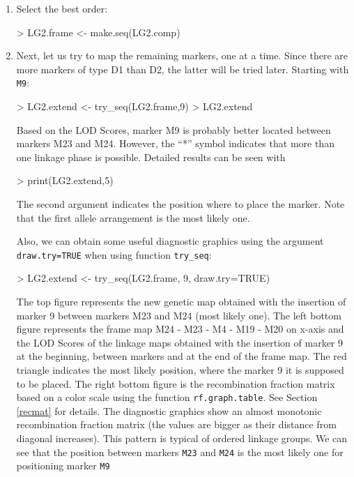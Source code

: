 \documentclass[letterpaper,12pt,oneside]{article}
\begin{document}
\begin{enumerate}
\item Select the best order:
\begin{Schunk}
\begin{Sinput}
> LG2.frame <- make.seq(LG2.comp)
\end{Sinput}
\end{Schunk}

\item Next, let us try to map the remaining markers, one at a time. Since there are more markers of type D1 than D2, the latter will be tried later. Starting with {\tt M9}:
\begin{Schunk}
\begin{Sinput}
> LG2.extend <- try_seq(LG2.frame,9)
> LG2.extend
\end{Sinput}
\end{Schunk}

Based on the LOD Scores, marker M9 is probably better located between markers M23 and M24. However, the ``*'' symbol indicates that more than one linkage phase is possible. Detailed results can be seen with

\begin{Schunk}
\begin{Sinput}
> print(LG2.extend,5)
\end{Sinput}
\end{Schunk}

The second argument indicates the position where to place the marker. Note that the first allele arrangement is the most likely one. 

Also, we can obtain some useful diagnostic graphics using the argument {\tt draw.try=TRUE} when using function {\tt try_seq}:

\begin{Schunk}
\begin{Sinput}
> LG2.extend <- try_seq(LG2.frame, 9, draw.try=TRUE)
\end{Sinput}
\end{Schunk}

The top figure represents the new genetic map obtained with the insertion of marker 9  between markers M23 and M24 (most likely one). The left bottom figure represents the frame map  M24 - M23 - M4 - M19 - M20 on x-axis and the LOD Scores of the linkage maps obtained with the insertion of marker 9 at the beginning, between markers and at the end of the frame map. The red triangle indicates the most likely position, where the marker 9 it is supposed to be placed. The right bottom figure is the recombination fraction matrix based on a color scale using the function {\tt rf.graph.table}. See Section \ref{recmat} for details. The diagnostic graphics show an almost monotonic recombination fraction matrix (the values are bigger as their distance from diagonal increases). This pattern is typical of ordered linkage groups. We can see that the position between markers {\tt M23} and {\tt M24} is the most likely one for positioning marker {\tt M9}


\end{enumerate}
\end{document}
